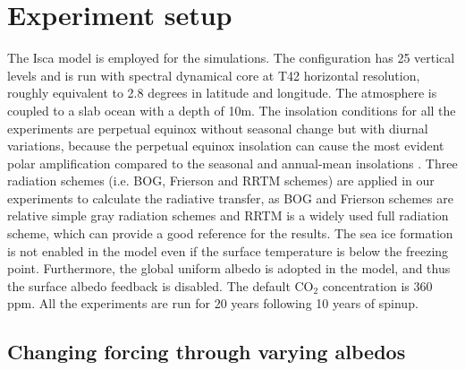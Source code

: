 
\section{Experiment setup}
\label{sec:polar_amiplicaiton_setup}

The Isca model is employed for the simulations. The configuration has 25 vertical levels and is run with spectral dynamical core at T42 horizontal resolution, roughly equivalent to 2.8 degrees in latitude and longitude. The atmosphere is coupled to a slab ocean with a depth of 10m. The insolation conditions for all the experiments are perpetual equinox without seasonal change but with diurnal variations, because the perpetual equinox insolation can cause the most evident polar amplification compared to the seasonal and annual-mean insolations \citep{Kim2018}. Three radiation schemes (i.e. BOG, Frierson and RRTM schemes) are applied in our experiments to calculate the radiative transfer, as BOG and Frierson schemes are relative simple gray radiation schemes and RRTM is a widely used full radiation scheme, which can provide a good reference for the results. The sea ice formation is not enabled in the model even if the surface temperature is below the freezing point. Furthermore, the global uniform albedo is adopted in the model, and thus the surface albedo feedback is disabled. The default CO$_2$ concentration is 360 ppm. All the experiments are run for 20 years following 10 years of spinup.


\subsection{Changing forcing through varying albedos}

